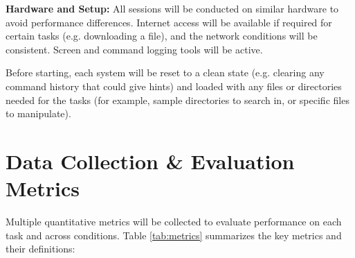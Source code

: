 \textbf{Hardware and Setup:} All sessions will be conducted on similar hardware to avoid performance differences. Internet access will be available if required for certain tasks (e.g. downloading a file), and the network conditions will be consistent. Screen and command logging tools will be active.

Before starting, each system will be reset to a clean state (e.g. clearing any command history that could give hints) and loaded with any files or directories needed for the tasks (for example, sample directories to search in, or specific files to manipulate).

\section{Data Collection \& Evaluation Metrics}

Multiple quantitative metrics will be collected to evaluate performance on each task and across conditions. Table \ref{tab:metrics} summarizes the key metrics and their definitions:

